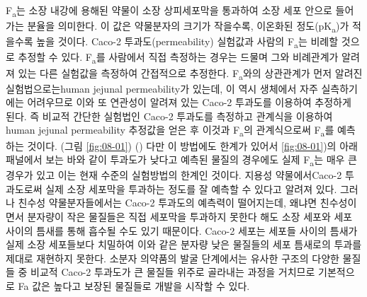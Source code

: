 \documentclass[
  11pt,
  krantz2, a4paper, twoside]{krantz}
\begin{document}
F\textsubscript{a}는 소장 내강에 용해된 약물이 소장 상피세포막을 통과하여 소장 세포 안으로 들어가는 분율을 의미한다.
이 값은 약물분자의 크기가 작을수록, 이온화된 정도(pK\textsubscript{a})가 적을수록 높을 것이다.
Caco-2 투과도(permeability) 실험값과 사람의 F\textsubscript{a}는 비례할 것으로 추정할 수 있다.
F\textsubscript{a}를 사람에서 직접 측정하는 경우는 드물며 그와 비례관계가 알려져 있는 다른 실험값을 측정하여 간접적으로 추정한다.
F\textsubscript{a}와의 상관관계가 먼저 알려진 실험법으로는human jejunal permeability가 있는데, 이 역시 생체에서 자주 실측하기에는 어려우므로 이와 또 연관성이 알려져 있는 Caco-2 투과도를 이용하여 추정하게 된다.
즉 비교적 간단한 실험법인 Caco-2 투과도를 측정하고 관계식을 이용하여 human jejunal permeability 추정값을 얻은 후 이것과 F\textsubscript{a}의 관계식으로써 F\textsubscript{a}를 예측하는 것이다. (그림 \ref{fig:08-01}) ()
다만 이 방법에도 한계가 있어서 \ref{fig:08-01})의 아래 패널에서 보는 바와 같이 투과도가 낮다고 예측된 물질의 경우에도 실제 F\textsubscript{a}는 매우 큰 경우가 있고 이는 현재 수준의 실험방법의 한계인 것이다.
지용성 약물에서Caco-2 투과도로써 실제 소장 세포막을 투과하는 정도를 잘 예측할 수 있다고 알려져 있다.
그러나 친수성 약물분자들에서는 Caco-2 투과도의 예측력이 떨어지는데, 왜냐면 친수성이면서 분자량이 작은 물질들은 직접 세포막을 투과하지 못한다 해도 소장 세포와 세포 사이의 틈새를 통해 흡수될 수도 있기 때문이다.
Caco-2 세포는 세포들 사이의 틈새가 실제 소장 세포들보다 치밀하여 이와 같은 분자량 낮은 물질들의 세포 틈새로의 투과를 제대로 재현하지 못한다.
소분자 의약품의 발굴 단계에서는 유사한 구조의 다양한 물질들 중 비교적 Caco-2 투과도가 큰 물질들 위주로 골라내는 과정을 거치므로 기본적으로 Fa 값은 높다고 보장된 물질들로 개발을 시작할 수 있다.
\end{document}
